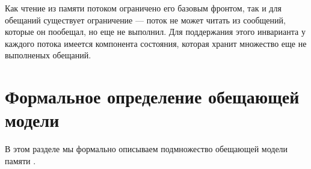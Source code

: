 Как чтение из памяти потоком ограничено его базовым фронтом, так и для обещаний существует ограничение ---
поток не может читать из сообщений, которые он пообещал, но еще не выполнил. Для поддержания этого инварианта
у каждого потока имеется компонента состояния, которая хранит множество еще не выполненых обещаний.

\section{Формальное определение обещающей модели}
\label{sec:promiseFormally}

В этом разделе мы формально описываем подмножество обещающей модели памяти \cite{Kang-al:POPL17}.

\begin{figure*}[t]
\small
{}
\end{figure*}
